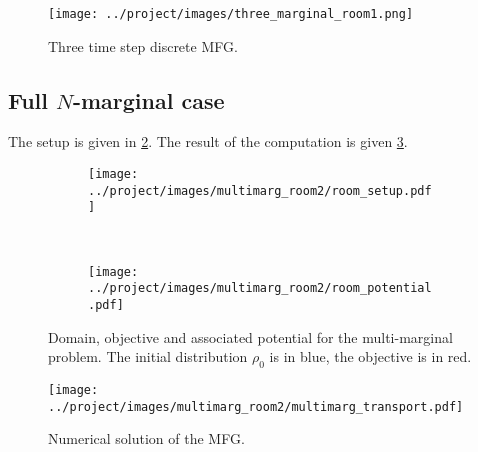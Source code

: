 \documentclass[../report.tex]{subfiles}
\begin{document}
\begin{figure}
	\centering
	\texttt{[image: ../project/images/three\_marginal\_room1.png]}
	\caption{Three time step discrete MFG.}\label{fig:3MargTransport}
\end{figure}



\subsection{Full $N$-marginal case}

The setup is given in \cref{fig:NMarg1DomainPot}. The result of the computation is given \cref{fig:NMarg1Steps}.


\begin{figure}
	\centering
	\begin{subfigure}[b]{.4\linewidth}
	\texttt{[image: ../project/images/multimarg\_room2/room\_setup.pdf]}
	\end{subfigure}~
	\begin{subfigure}[b]{.5\linewidth}
	\texttt{[image: ../project/images/multimarg\_room2/room\_potential.pdf]}
	\end{subfigure}
	\caption{Domain, objective and associated potential for the multi-marginal problem. The initial distribution $\rho_0$ is in blue, the objective is in red.}\label{fig:NMarg1DomainPot}
\end{figure}

\begin{figure}
	\centering
	\texttt{[image: ../project/images/multimarg\_room2/multimarg\_transport.pdf]}
	\caption{Numerical solution of the MFG.}\label{fig:NMarg1Steps}
\end{figure}
\end{document}
